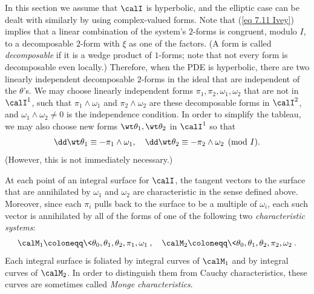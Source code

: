 In this section we assume that $\calI$ is hyperbolic, and the elliptic case can be dealt with similarly by using complex-valued forms. Note that (\ref{eq 7.11 Ivey}) implies that a linear combination of the system's $2$-forms is congruent, modulo $I$, to a decomposable $2$-form with $\xi$ as one of the factors. (A form is called \emph{decomposable} if it is a wedge product of $1$-forms; note that not every form is decomposable even locally.) Therefore, when the PDE is hyperbolic, there are two linearly independent decomposable $2$-forms in the ideal that are independent of the $\theta$'s. We may choose linearly independent forms $\pi_1,\pi_2,\omega_1,\omega_2$ that are not in $\calI^1$, such that $\pi_1\wedge\omega_1$ and $\pi_2\wedge\omega_2$ are these decomposable forms in $\calI^2$, and $\omega_1\wedge\omega_2\neq 0$ is the independence condition. In order to simplify the tableau, we may also choose new forms $\wt\theta_1,\wt\theta_2$ in $\calI^1$ so that 
\[\dd\wt\theta_1\equiv -\pi_1\wedge\omega_1,\quad \dd\wt\theta_2\equiv -\pi_2\wedge\omega_2\pmod{I}.\label{eq 7.12 Ivey}\]
(However, this is not immediately necessary.)

At each point of an integral surface for $\calI$, the tangent vectors to the surface that are annihilated by $\omega_1$ and $\omega_2$ are characteristic in the sense defined above. Moreover, since each $\pi_i$ pulls back to the surface to be a multiple of $\omega_i$, each such vector is annihilated by all of the forms of one of the following two \emph{characteristic systems}:
\[\calM_1\coloneqq \<\theta_0,\theta_1,\theta_2,\pi_1,\omega_1\>,\quad \calM_2\coloneqq \<\theta_0,\theta_1,\theta_2,\pi_2,\omega_2\>.\]
Each integral surface is foliated by integral curves of $\calM_1$ and by integral curves of $\calM_2$. In order to distinguish them from Cauchy characteristics, these curves are sometimes called \emph{Monge characteristics}.

